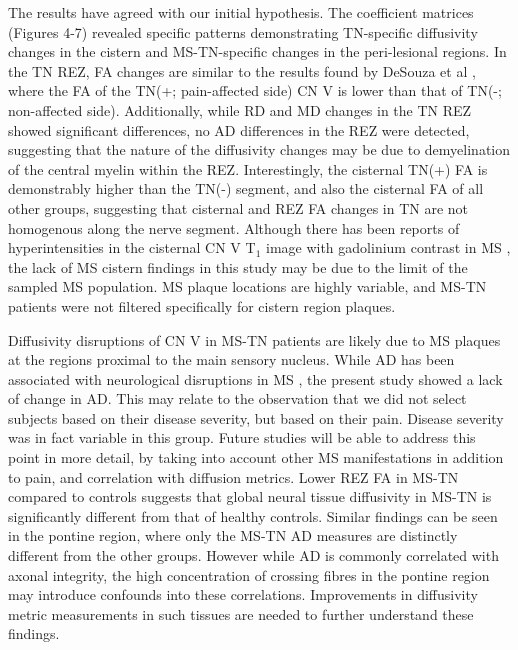 The results have agreed with our initial hypothesis. The coefficient matrices (Figures 4-7) revealed specific patterns demonstrating TN-specific diffusivity changes in the cistern and MS-TN-specific changes in the peri-lesional regions. In the TN REZ, FA changes are similar to the results found by DeSouza et al \cite{Desouza2013,Desouza2013c}, where the FA of the TN(+; pain-affected side) CN V is lower than that of TN(-; non-affected side). Additionally, while RD and MD changes in the TN REZ showed significant differences, no AD differences in the REZ were detected, suggesting that the nature of the diffusivity changes may be due to demyelination of the central myelin within the REZ. Interestingly, the cisternal TN(+) FA is demonstrably higher than the TN(-) segment, and also the cisternal FA of all other groups, suggesting that cisternal and REZ FA changes in TN are not homogenous along the nerve segment. Although there has been reports of hyperintensities in the cisternal CN V T$_{1}$ image with gadolinium contrast in MS \cite{VanderMeijs2002}, the lack of MS cistern findings in this study may be due to the limit of the sampled MS population. MS plaque locations are highly variable, and MS-TN patients were not filtered specifically for cistern region plaques. 

Diffusivity disruptions of CN V in MS-TN patients are likely due to MS plaques at the regions proximal to the main sensory nucleus. While AD has been associated with neurological disruptions in MS \cite{Budde2009,Kim2006}, the present study showed a lack of change in AD. This may relate to the observation that we did not select subjects based on their disease severity, but based on their pain. Disease severity was in fact variable in this group. Future studies will be able to address this point in more detail, by taking into account other MS manifestations in addition to pain, and correlation with diffusion metrics. Lower REZ FA in MS-TN compared to controls suggests that global neural tissue diffusivity in MS-TN is significantly different from that of healthy controls. Similar findings can be seen in the pontine region, where only the MS-TN AD measures are distinctly different from the other groups. However while AD is commonly correlated with axonal integrity, the high concentration of crossing fibres in the pontine region may introduce confounds into these correlations. Improvements in diffusivity metric measurements in such tissues are needed to further understand these findings. 

